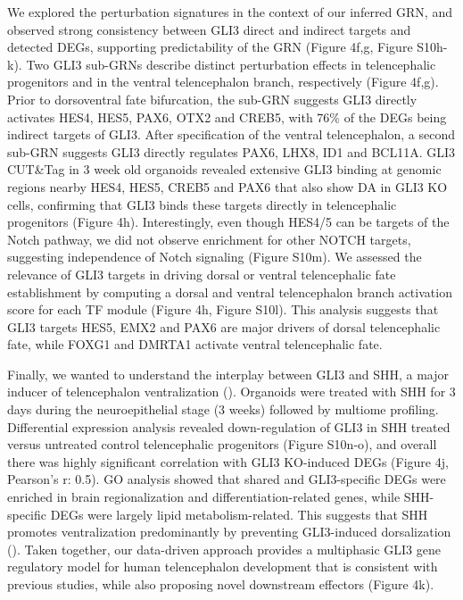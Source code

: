 We explored the perturbation signatures in the context of our inferred GRN, and observed strong consistency between GLI3 direct and indirect targets and detected DEGs, supporting predictability of the GRN (Figure 4f,g, Figure S10h-k). Two GLI3 sub-GRNs describe distinct perturbation effects in telencephalic progenitors and in the ventral telencephalon branch, respectively (Figure 4f,g). Prior to dorsoventral fate bifurcation, the sub-GRN suggests GLI3 directly activates HES4, HES5, PAX6, OTX2 and CREB5, with 76\% of the DEGs being indirect targets of GLI3. After specification of the ventral telencephalon, a second sub-GRN suggests GLI3 directly regulates PAX6, LHX8, ID1 and BCL11A. GLI3 CUT\&Tag in 3 week old organoids revealed extensive GLI3 binding at genomic regions nearby HES4, HES5, CREB5 and PAX6 that also show DA in GLI3 KO cells, confirming that GLI3 binds these targets directly in telencephalic progenitors (Figure 4h). Interestingly, even though HES4/5 can be targets of the Notch pathway, we did not observe enrichment for other NOTCH targets, suggesting independence of Notch signaling (Figure S10m). We assessed the relevance of GLI3 targets in driving dorsal or ventral telencephalic fate establishment by computing a dorsal and ventral telencephalon branch activation score for each TF module (Figure 4h, Figure S10l). This analysis suggests that GLI3 targets HES5, EMX2 and PAX6 are major drivers of dorsal telencephalic fate, while FOXG1 and DMRTA1 activate ventral telencephalic fate.

Finally, we wanted to understand the interplay between GLI3 and SHH, a major inducer of telencephalon ventralization (\cite{echelard_sonic_1993,ericson_sonic_1995}). Organoids were treated with SHH for 3 days during the neuroepithelial stage (3 weeks) followed by multiome profiling. Differential expression analysis revealed down-regulation of GLI3 in SHH treated versus untreated control telencephalic progenitors (Figure S10n-o), and overall there was highly significant correlation with GLI3 KO-induced DEGs (Figure 4j, Pearson’s r: 0.5). GO analysis showed that shared and GLI3-specific DEGs were enriched in brain regionalization and differentiation-related genes, while SHH-specific DEGs were largely lipid metabolism-related. This suggests that SHH promotes ventralization predominantly by preventing GLI3-induced dorsalization (\cite{rallu_dorsoventral_2002,rash_patterning_2007}). Taken together, our data-driven approach provides a multiphasic GLI3 gene regulatory model for human telencephalon development that is consistent with previous studies, while also proposing novel downstream effectors (Figure 4k).


